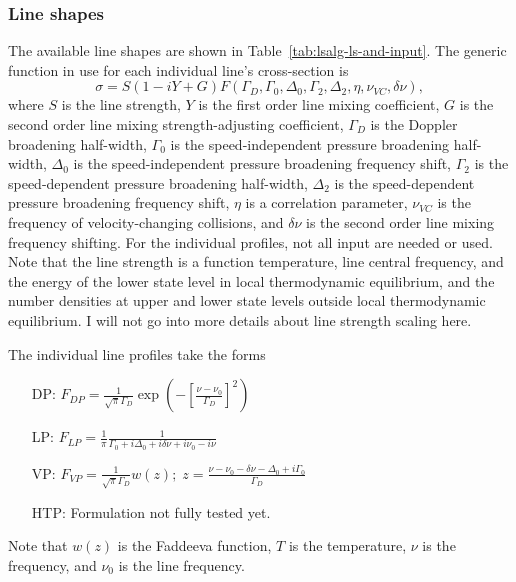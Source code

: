 \subsubsection{Line shapes}

The available line shapes are shown in Table~\ref{tab:lsalg-ls-and-input}.
The generic function in use for  each individual line's cross-section is
\begin{equation}
 \sigma = S \left(1 - iY + G\right) F\left( \Gamma_D, \Gamma_0, 
            \Delta_0, \Gamma_2, \Delta_2, \eta, \nu_{VC}, \delta\nu \right),
 \label{eq:lsalg-standard-equation}
\end{equation}
where
$S$ is the line strength,
$Y$ is the first order line mixing coefficient,
$G$ is the second order line mixing strength-adjusting coefficient,
$\Gamma_D$ is the Doppler broadening half-width,
$\Gamma_0$ is the speed-independent pressure broadening half-width,
$\Delta_0$ is the speed-independent pressure broadening frequency shift,
$\Gamma_2$ is the speed-dependent pressure broadening half-width,
$\Delta_2$ is the speed-dependent pressure broadening frequency shift,
$\eta$ is a correlation parameter,
$\nu_{VC}$ is the frequency of velocity-changing collisions, and
$\delta\nu$ is the second order line mixing frequency shifting.
For the individual profiles, not all input are needed or used.
Note that the line strength is a function temperature, 
line central frequency, and the energy of the lower state level in local
thermodynamic equilibrium, and the number densities at upper and 
lower state levels outside local thermodynamic equilibrium.
I will not go into more details about line strength scaling here.

The individual line profiles take the forms
\begin{itemize}
 \item[DP:] $F_{DP} = \frac{1}{\sqrt{\pi}\Gamma_D} 
 \exp\left(-\left[\frac{\nu - \nu_0}{\Gamma_D}\right]^2\right)$
 
 \item[LP:] $F_{LP} = \frac{1}{\pi} \frac{1}{\Gamma_0+i\Delta_0+i\delta\nu+i\nu_0-i\nu}$
 
 \item[VP:] $F_{VP} = \frac{1}{\sqrt{\pi}\Gamma_D} w\left(z\right);\;z=\frac{\nu-\nu_0-\delta\nu-\Delta_0 + i\Gamma_0}{\Gamma_D}$
 
 \item[HTP:] Formulation not fully tested yet.
\end{itemize}
Note that
$w(z)$ is the Faddeeva function,
$T$ is the temperature,
$\nu$ is the frequency, and 
$\nu_0$ is the line frequency.

